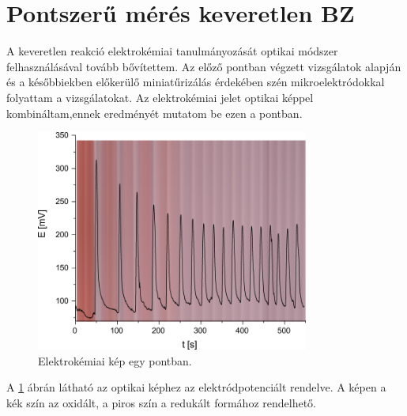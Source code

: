 \section{Pontszerű mérés keveretlen BZ}
A keveretlen reakció elektrokémiai tanulmányozását optikai módszer felhasználásával tovább bővítettem. Az előző pontban végzett vizsgálatok alapján és a későbbiekben előkerülő miniatűrizálás érdekében szén mikroelektródokkal folyattam a vizsgálatokat. Az elektrokémiai jelet optikai képpel kombináltam,ennek eredményét  mutatom be ezen a pontban.

\begin{figure}
\centering
\includegraphics[width=0.8\textwidth]{img/pontszerumeres.png}
\caption{Elektrokémiai kép egy pontban.}
\label{fig:pontszerumeres}
\end{figure}

A \ref{fig:pontszerumeres} ábrán látható az optikai képhez az elektródpotenciált rendelve. A képen a kék szín az oxidált, a piros szín a redukált formához rendelhető.


